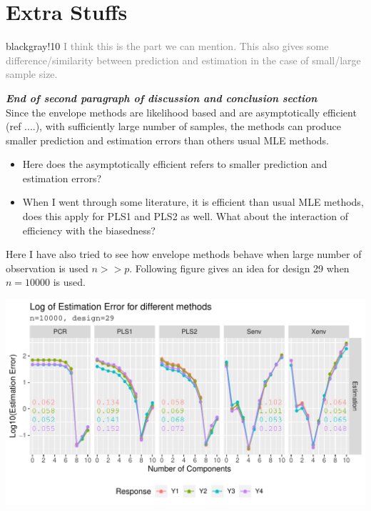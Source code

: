 \documentclass[12pt, a4paper]{scrartcl}
\begin{document}
\section{Extra Stuffs}
\begin{cbox}{black}{gray!10}
\small
\textcolor{gray}{I think this is the part we can mention. This also gives some difference/similarity between prediction and estimation in the case of small/large sample size.}

\textcolor{critical}{
\textbf{\textcolor{mycolor1}{\textit{End of second paragraph of discussion and conclusion section}}} \hfill\\
Since the envelope methods are likelihood based and are asymptotically efficient (ref ....), with sufficiently large number of samples, the methods can produce smaller prediction and estimation errors than others usual MLE methods.}

\begin{itemize}[leftmargin=1em]
\item Here does the asymptotically efficient refers to smaller prediction 
  and estimation errors?
\item When I went through some literature, it is efficient than usual MLE 
  methods, does this apply for PLS1 and PLS2 as well. What about the 
  interaction of efficiency with the biasedness?
\end{itemize}

\textcolor{answers}{Here I have also tried to see how envelope methods behave when large number of observation is used $n>>p$. Following figure gives an idea for design 29 when $n=10000$ is used.}

\vspace{1em}

\includegraphics[width=\textwidth]{large-n-est-error.pdf}
\end{cbox}

%
%
\end{document}
